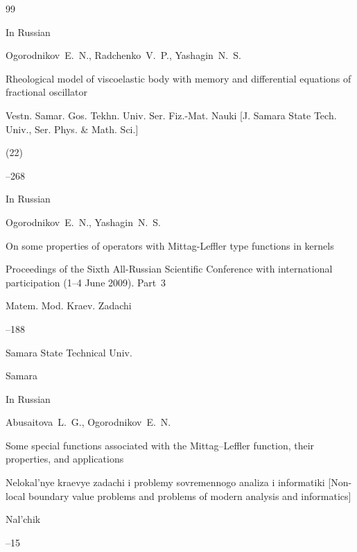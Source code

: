 \begin{thebibliography}{99}

\lang In Russian

\by Ogorodnikov~E.~N., Radchenko~V.~P., Yashagin~N.~S.

\paper Rheological model of viscoelastic  body with memory and differential equations of fractional oscillator

\jour Vestn. Samar. Gos. Tekhn. Univ. Ser. Fiz.-Mat. Nauki \rm [J. Samara State Tech. Univ., Ser. Phys. \& Math. Sci.]


(22)

--268







\lang In Russian

\by Ogorodnikov~E.~N., Yashagin~N.~S.

\paper On some properties of operators with Mittag-Leffler type functions in kernels

\inbook Proceedings of the Sixth All-Russian Scientific Conference with international participation \rm (1--4 June 2009). Part~3

\serial Matem. Mod. Kraev. Zadachi


--188

\publ Samara State Technical Univ.

\publaddr Samara








\lang In Russian

\by Abusaitova~L.~G., Ogorodnikov~E.~N.

\paper Some special functions associated with the Mittag--Leffler function, their properties, and applications

\inbook Nelokal'nye kraevye zadachi i problemy sovremennogo analiza i informatiki \rm [Non-local boundary value problems and problems of modern analysis and informatics]

\publaddr Nal'chik


--15








\end{thebibliography}
